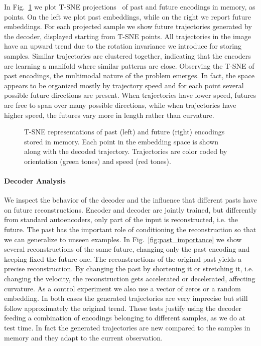 \documentclass[10pt,twocolumn,letterpaper]{article}
\begin{document}
In Fig.~\ref{fig:tsne} we plot T-SNE projections~\cite{maaten2008visualizing} of past and future encodings in memory, as points. On the left we plot past embeddings, while on the right we report future embeddings. For each projected sample we show future trajectories generated by the decoder, displayed starting from T-SNE points. All trajectories in the image have an upward trend due to the rotation invariance we introduce for storing samples. Similar trajectories are clustered together, indicating that the encoders are learning a manifold where similar patterns are close. Observing the T-SNE of past encodings, the multimodal nature of the problem emerges. In fact, the space appears to be organized mostly by trajectory speed and for each point several possible future directions are present. When trajectories have lower speed, futures are free to span over many possible directions, while when trajectories have higher speed, the futures vary more in length rather than curvature.

\begin{figure}[t]
	\centering	
{}\hspace{2pt}
\caption{T-SNE representations of past (left) and future (right) encodings stored in memory. Each point in the embedding space is shown along with the decoded trajectory. Trajectories are color coded by orientation (green tones) and speed (red tones).}
	\label{fig:tsne}
\end{figure}

\vspace{-10pt}
\paragraph{Decoder Analysis}
We inspect the behavior of the decoder and the influence that different pasts have on future reconstructions. Encoder and decoder are jointly trained, but differently from standard autoencoders, only part of the input is reconstructed, i.e. the future. The past has the important role of conditioning the reconstruction so that we can generalize to unseen examples. In Fig.~\ref{fig:past_importance} we show several reconstructions of the same future, changing only the past encoding and keeping fixed the future one. The reconstructions of the original past yields a precise reconstruction. By changing the past by shortening it or stretching it, i.e. changing the velocity, the reconstruction gets accelerated or decelerated, affecting curvature. As a control experiment we also use a vector of zeros or a random embedding. In both cases the generated trajectories are very imprecise but still follow approximately the original trend. These tests justify using the decoder feeding a combination of encodings belonging to different samples, as we do at test time. In fact the generated trajectories are new compared to the samples in memory and they adapt to the current observation.
\end{document}
